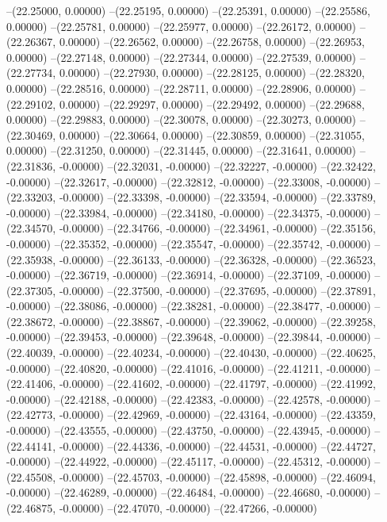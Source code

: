 --(22.25000, 0.00000)
--(22.25195, 0.00000)
--(22.25391, 0.00000)
--(22.25586, 0.00000)
--(22.25781, 0.00000)
--(22.25977, 0.00000)
--(22.26172, 0.00000)
--(22.26367, 0.00000)
--(22.26562, 0.00000)
--(22.26758, 0.00000)
--(22.26953, 0.00000)
--(22.27148, 0.00000)
--(22.27344, 0.00000)
--(22.27539, 0.00000)
--(22.27734, 0.00000)
--(22.27930, 0.00000)
--(22.28125, 0.00000)
--(22.28320, 0.00000)
--(22.28516, 0.00000)
--(22.28711, 0.00000)
--(22.28906, 0.00000)
--(22.29102, 0.00000)
--(22.29297, 0.00000)
--(22.29492, 0.00000)
--(22.29688, 0.00000)
--(22.29883, 0.00000)
--(22.30078, 0.00000)
--(22.30273, 0.00000)
--(22.30469, 0.00000)
--(22.30664, 0.00000)
--(22.30859, 0.00000)
--(22.31055, 0.00000)
--(22.31250, 0.00000)
--(22.31445, 0.00000)
--(22.31641, 0.00000)
--(22.31836, -0.00000)
--(22.32031, -0.00000)
--(22.32227, -0.00000)
--(22.32422, -0.00000)
--(22.32617, -0.00000)
--(22.32812, -0.00000)
--(22.33008, -0.00000)
--(22.33203, -0.00000)
--(22.33398, -0.00000)
--(22.33594, -0.00000)
--(22.33789, -0.00000)
--(22.33984, -0.00000)
--(22.34180, -0.00000)
--(22.34375, -0.00000)
--(22.34570, -0.00000)
--(22.34766, -0.00000)
--(22.34961, -0.00000)
--(22.35156, -0.00000)
--(22.35352, -0.00000)
--(22.35547, -0.00000)
--(22.35742, -0.00000)
--(22.35938, -0.00000)
--(22.36133, -0.00000)
--(22.36328, -0.00000)
--(22.36523, -0.00000)
--(22.36719, -0.00000)
--(22.36914, -0.00000)
--(22.37109, -0.00000)
--(22.37305, -0.00000)
--(22.37500, -0.00000)
--(22.37695, -0.00000)
--(22.37891, -0.00000)
--(22.38086, -0.00000)
--(22.38281, -0.00000)
--(22.38477, -0.00000)
--(22.38672, -0.00000)
--(22.38867, -0.00000)
--(22.39062, -0.00000)
--(22.39258, -0.00000)
--(22.39453, -0.00000)
--(22.39648, -0.00000)
--(22.39844, -0.00000)
--(22.40039, -0.00000)
--(22.40234, -0.00000)
--(22.40430, -0.00000)
--(22.40625, -0.00000)
--(22.40820, -0.00000)
--(22.41016, -0.00000)
--(22.41211, -0.00000)
--(22.41406, -0.00000)
--(22.41602, -0.00000)
--(22.41797, -0.00000)
--(22.41992, -0.00000)
--(22.42188, -0.00000)
--(22.42383, -0.00000)
--(22.42578, -0.00000)
--(22.42773, -0.00000)
--(22.42969, -0.00000)
--(22.43164, -0.00000)
--(22.43359, -0.00000)
--(22.43555, -0.00000)
--(22.43750, -0.00000)
--(22.43945, -0.00000)
--(22.44141, -0.00000)
--(22.44336, -0.00000)
--(22.44531, -0.00000)
--(22.44727, -0.00000)
--(22.44922, -0.00000)
--(22.45117, -0.00000)
--(22.45312, -0.00000)
--(22.45508, -0.00000)
--(22.45703, -0.00000)
--(22.45898, -0.00000)
--(22.46094, -0.00000)
--(22.46289, -0.00000)
--(22.46484, -0.00000)
--(22.46680, -0.00000)
--(22.46875, -0.00000)
--(22.47070, -0.00000)
--(22.47266, -0.00000)
